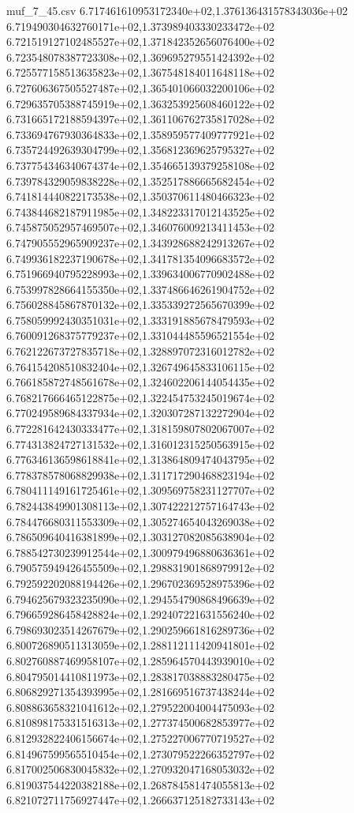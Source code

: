\begin{filecontents*}{muf_7_45.csv}
6.717461610953172340e+02,1.376136431578343036e+02
6.719490304632760171e+02,1.373989403330233472e+02
6.721519127102485527e+02,1.371842352656076400e+02
6.723548078387723308e+02,1.369695279551424392e+02
6.725577158513635823e+02,1.367548184011648118e+02
6.727606367505527487e+02,1.365401066032200106e+02
6.729635705388745919e+02,1.363253925608460122e+02
6.731665172188594397e+02,1.361106762735817028e+02
6.733694767930364833e+02,1.358959577409777921e+02
6.735724492639304799e+02,1.356812369625795327e+02
6.737754346340674374e+02,1.354665139379258108e+02
6.739784329059838228e+02,1.352517886665682454e+02
6.741814440822173538e+02,1.350370611480466323e+02
6.743844682187911985e+02,1.348223317012143525e+02
6.745875052957469507e+02,1.346076009213411453e+02
6.747905552965909237e+02,1.343928688242913267e+02
6.749936182237190678e+02,1.341781354096683572e+02
6.751966940795228993e+02,1.339634006770902488e+02
6.753997828664155350e+02,1.337486646261904752e+02
6.756028845867870132e+02,1.335339272565670399e+02
6.758059992430351031e+02,1.333191885678479593e+02
6.760091268375779237e+02,1.331044485596521554e+02
6.762122673727835718e+02,1.328897072316012782e+02
6.764154208510832404e+02,1.326749645833106115e+02
6.766185872748561678e+02,1.324602206144054435e+02
6.768217666465122875e+02,1.322454753245019674e+02
6.770249589684337934e+02,1.320307287132272904e+02
6.772281642430333477e+02,1.318159807802067007e+02
6.774313824727131532e+02,1.316012315250563915e+02
6.776346136598618841e+02,1.313864809474043795e+02
6.778378578068829938e+02,1.311717290468823194e+02
6.780411149161725461e+02,1.309569758231127707e+02
6.782443849901308113e+02,1.307422212757164743e+02
6.784476680311553309e+02,1.305274654043269038e+02
6.786509640416381899e+02,1.303127082085638904e+02
6.788542730239912544e+02,1.300979496880636361e+02
6.790575949426455509e+02,1.298831901868979912e+02
6.792592202088194426e+02,1.296702369528975396e+02
6.794625679323235090e+02,1.294554790868496639e+02
6.796659286458428824e+02,1.292407221631556240e+02
6.798693023514267679e+02,1.290259661816289736e+02
6.800726890511313059e+02,1.288112111420941801e+02
6.802760887469958107e+02,1.285964570443939010e+02
6.804795014410811973e+02,1.283817038883280475e+02
6.806829271354393995e+02,1.281669516737438244e+02
6.808863658321041612e+02,1.279522004004475093e+02
6.810898175331516313e+02,1.277374500682853977e+02
6.812932822406156674e+02,1.275227006770719527e+02
6.814967599565510454e+02,1.273079522266352797e+02
6.817002506830045832e+02,1.270932047168053032e+02
6.819037544220382188e+02,1.268784581474055813e+02
6.821072711756927447e+02,1.266637125182733143e+02

\end{filecontents*}
